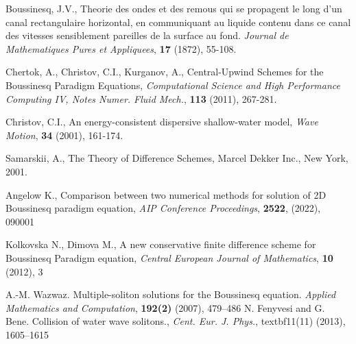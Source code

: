 \documentclass[%
 aip,
cp,  
 amsmath,amssymb,
 reprint,
]{iopconfser}
\begin{document}
\begin{thebibliography}{99} \normalsize

 Boussinesq, J.V., Theorie des ondes et des remous qui se propagent le long d'un canal rectangulaire horizontal, en communiquant au liquide contenu dans ce canal des vitesses sensiblement pareilles de la surface au fond.  {\it Journal de Mathematiques Pures et Appliquees}, \textbf{17} (1872), 55-108.

 Chertok, A., Christov, C.I., Kurganov, A., Central-Upwind Schemes for the Boussinesq Paradigm Equations,
{\it Computational Science and High Performance Computing IV, Notes Numer. Fluid Mech.}, \textbf{113} (2011), 267-281.

 Christov, C.I., An energy-consistent dispersive shallow-water model,  {\it Wave Motion}, \textbf{34} (2001), 161-174.

 Samarskii, A., The Theory of Difference Schemes, Marcel Dekker Inc., New York, 2001.

 Angelow K., Comparison between two numerical methods for solution of 2D Boussinesq paradigm equation, \emph{AIP Conference Proceedings}, \textbf{2522}, (2022), 090001

 Kolkovska N., Dimova M., A new conservative finite difference scheme for Boussinesq Paradigm equation, \emph{ Central European Journal of Mathematics}, \textbf{10} (2012), 3

 A.-M. Wazwaz. Multiple-soliton solutions for the Boussinesq equation. \emph{Applied Mathematics and Computation}, \textbf{192(2)} (2007), 479–486
 N. Fenyvesi and G. Bene. Collision of water wave solitons., \emph{Cent. Eur. J. Phys.}, textbf{11(11)} (2013), 1605–1615

\end{thebibliography}
\end{document}
